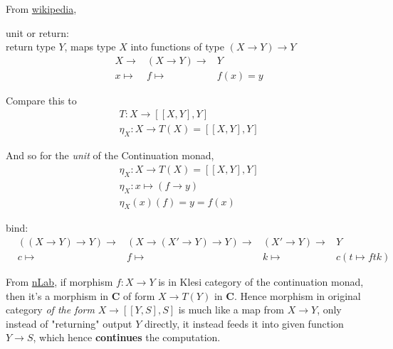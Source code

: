 \documentclass[10pt]{amsart}
\begin{document}
\begin{multicols*}{2}
From \href{https://en.wikipedia.org/wiki/Monad\_(functional\_programming)\#Continuation\_monad}{wikipedia},

unit or return:  \\

return type $Y$, maps type $X$ into functions of type $(X \to Y) \to Y$
\begin{equation} 
\begin{aligned}
	& X \to & (X\to Y) \to & Y \\
	& x\mapsto & f \mapsto & f(x) = y
\end{aligned}
\end{equation}

Compare this to
\begin{equation}
\begin{aligned}
& T : X \to [[X, Y], Y] \\ 
& \eta_X : X \to T(X) = [[X,Y], Y]
\end{aligned}
\end{equation}

And so for the \emph{unit} of the Continuation monad,
\begin{equation}
\boxed{
\begin{aligned}
& \eta_X : X \to T(X) = [[X, Y], Y] \\
& \eta_X : x\mapsto (f \to y) \\ 
& \eta_X(x)(f) = y = f(x)
\end{aligned}
}
\end{equation}

bind: \\

\begin{equation}\label{Eq:ContinuationMonadBindWiki}
\begin{aligned}
& ((X\to Y) \to Y) \to & (X \to (X' \to Y) \to Y) \to & (X' \to Y) \to & Y \\
& c \mapsto & f \mapsto & k \mapsto &  c(t\mapsto ftk)
\end{aligned}
\end{equation}

From \href{https://ncatlab.org/nlab/show/continuation+monad}{nLab}, if morphism $f:X\to Y$ is in Klesi category of the continuation monad, then it's a morphism in $\mathbf{C}$ of form $X\to T(Y)$ in $\mathbf{C}$. Hence morphism in original category \emph{of the form} $X\to [[Y,S], S]$ is much like a map from $X \to Y$, only instead of "returning" output $Y$ directly, it instead feeds it into given function $Y\to S$, which hence \textbf{continues} the computation. 


\end{multicols*}
\end{document}
